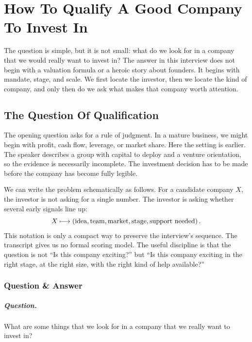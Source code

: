 \chapter{How To Qualify A Good Company To Invest In}

The question is simple, but it is not small: what do we look for in a company that we would really want to invest in? The answer in this interview does not begin with a valuation formula or a heroic story about founders. It begins with mandate, stage, and scale. We first locate the investor, then we locate the kind of company, and only then do we ask what makes that company worth attention.

\section{The Question Of Qualification}

The opening question asks for a rule of judgment. In a mature business, we might begin with profit, cash flow, leverage, or market share. Here the setting is earlier. The speaker describes a group with capital to deploy and a venture orientation, so the evidence is necessarily incomplete. The investment decision has to be made before the company has become fully legible.

We can write the problem schematically as follows. For a candidate company \(X\), the investor is not asking for a single number. The investor is asking whether several early signals line up:
\begin{equation}
X \longmapsto
\left(
\hbox{idea},
\hbox{team},
\hbox{market},
\hbox{stage},
\hbox{support needed}
\right).
\end{equation}
This notation is only a compact way to preserve the interview's sequence. The transcript gives us no formal scoring model. The useful discipline is that the question is not ``Is this company exciting?'' but ``Is this company exciting in the right stage, at the right size, with the right kind of help available?''

\subsection{Question \& Answer}

\paragraph{Question.}
What are some things that we look for in a company that we really want to invest in?


